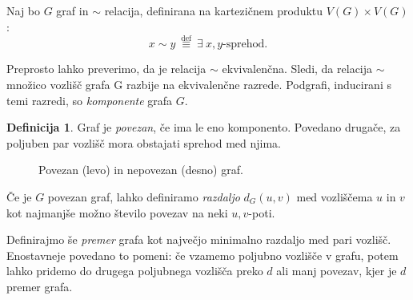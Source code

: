 \documentclass[12pt,a4paper]{amsart}
\theoremstyle{definition} %
\newtheorem{definicija}{Definicija}[section]
\theoremstyle{plain} %
\newcommand{\N}{\mathbb N}
\newcommand{\vozlisca}[1][G]{\ensuremath{V(#1)}}
\begin{document}
Naj bo $G$ graf in $\sim$ relacija, definirana na kartezičnem produktu $\vozlisca \times \vozlisca$:
\[ x \sim y \ \stackrel{\text{def}}{\equiv} \ \exists \ x,y \text{-sprehod.} \]

Preprosto lahko preverimo, da je relacija $\sim$ ekvivalenčna. Sledi, da relacija $\sim$ množico vozlišč grafa G razbije na ekvivalenčne razrede. Podgrafi, inducirani s temi razredi, so \emph{komponente} grafa $G$.

\begin{definicija}
	Graf je \emph{povezan}, če ima le eno komponento. Povedano drugače, za poljuben par vozlišč mora obstajati sprehod med njima.
\end{definicija}

\begin{figure}[h]
    \caption{Povezan (levo) in nepovezan (desno) graf.}
\end{figure}

Če je $G$ povezan graf, lahko definiramo \emph{razdaljo} $d_G(u,v)$ med vozliščema $u$ in $v$ kot najmanjše možno število povezav na neki $u,v$-poti.

Definirajmo še \emph{premer} grafa kot največjo minimalno razdaljo med pari vozlišč. Enostavneje povedano to pomeni: če vzamemo poljubno vozlišče v grafu, potem lahko pridemo do drugega poljubnega vozlišča preko $d$ ali manj povezav, kjer je $d$ premer grafa.
\end{document}
